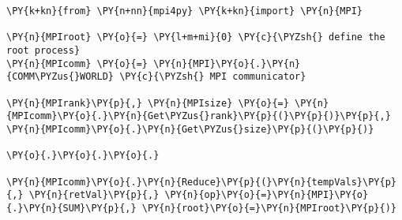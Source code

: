 \begin{Verbatim}[commandchars=\\\{\}]
\PY{k+kn}{from} \PY{n+nn}{mpi4py} \PY{k+kn}{import} \PY{n}{MPI}

\PY{n}{MPIroot} \PY{o}{=} \PY{l+m+mi}{0} \PY{c}{\PYZsh{} define the root process}
\PY{n}{MPIcomm} \PY{o}{=} \PY{n}{MPI}\PY{o}{.}\PY{n}{COMM\PYZus{}WORLD} \PY{c}{\PYZsh{} MPI communicator}

\PY{n}{MPIrank}\PY{p}{,} \PY{n}{MPIsize} \PY{o}{=} \PY{n}{MPIcomm}\PY{o}{.}\PY{n}{Get\PYZus{}rank}\PY{p}{(}\PY{p}{)}\PY{p}{,} \PY{n}{MPIcomm}\PY{o}{.}\PY{n}{Get\PYZus{}size}\PY{p}{(}\PY{p}{)}

\PY{o}{.}\PY{o}{.}\PY{o}{.}

\PY{n}{MPIcomm}\PY{o}{.}\PY{n}{Reduce}\PY{p}{(}\PY{n}{tempVals}\PY{p}{,} \PY{n}{retVal}\PY{p}{,} \PY{n}{op}\PY{o}{=}\PY{n}{MPI}\PY{o}{.}\PY{n}{SUM}\PY{p}{,} \PY{n}{root}\PY{o}{=}\PY{n}{MPIroot}\PY{p}{)}
\end{Verbatim}
